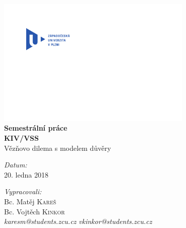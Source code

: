 \begin{titlepage}
\begin{center}


~\\[2.5cm]
\includegraphics[width=0.7\textwidth]{res/logo}
\\[0.5cm]


{ \huge \bf Semestrální práce \\ KIV/VSS \\[0.6cm] }
{ \LARGE \sc Vězňovo dilema s modelem důvěry }

\vfill

\begin{minipage}[b]{0.49\textwidth}
\begin{flushleft} 
\emph{Datum:}\\
20. ledna 2018
\end{flushleft}
\end{minipage}
\begin{minipage}[b]{0.49\textwidth}
\begin{flushright} 
\emph{Vypracovali:} \\
Bc. Matěj \textsc{Kareš}\\
Bc. Vojtěch \textsc{Kinkor}\\
\textit{karesm@students.zcu.cz}
\textit{vkinkor@students.zcu.cz}
\end{flushright}
\end{minipage}



\end{center}
\end{titlepage}